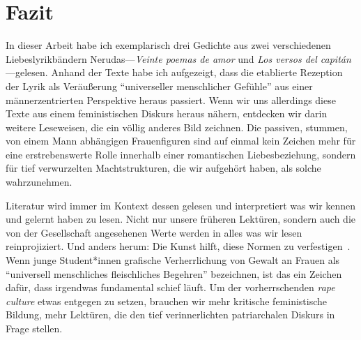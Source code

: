 \section{Fazit}

In dieser Arbeit habe ich exemplarisch drei Gedichte aus zwei verschiedenen Liebeslyrikbändern Nerudas—\textit{Veinte poemas de amor} und \textit{Los versos del capitán}—gelesen.
Anhand der Texte habe ich aufgezeigt, dass die etablierte Rezeption der Lyrik als Veräußerung ``universeller menschlicher Gefühle'' aus einer männerzentrierten Perspektive heraus passiert.
Wenn wir uns allerdings diese Texte aus einem feministischen Diskurs heraus nähern, entdecken wir darin weitere Leseweisen, die ein völlig anderes Bild zeichnen.
Die passiven, stummen, von einem Mann abhängigen Frauenfiguren sind auf einmal kein Zeichen mehr für eine erstrebenswerte Rolle innerhalb einer romantischen Liebesbeziehung, sondern für tief verwurzelten Machtstrukturen, die wir aufgehört haben, als solche wahrzunehmen.

Literatur wird immer im Kontext dessen gelesen und interpretiert was wir kennen und gelernt haben zu lesen.
Nicht nur unsere früheren Lektüren, sondern auch die von der Gesellschaft angesehenen Werte werden in alles was wir lesen reinprojiziert.
Und anders herum: Die Kunst hilft, diese Normen zu verfestigen~\cite{Kolodny1980}.
Wenn junge Student*innen grafische Verherrlichung von Gewalt an Frauen als ``universell menschliches fleischliches Begehren'' bezeichnen, ist das ein Zeichen dafür, dass irgendwas fundamental schief läuft.
Um der vorherrschenden \textit{rape culture} etwas entgegen zu setzen, brauchen wir mehr kritische feministische Bildung, mehr Lektüren, die den tief verinnerlichten patriarchalen Diskurs in Frage stellen.

\begin{comment}
* "als nah, natürlich wahrgenommen", die Leser*innen können sich damit identifizieren
  ** Duncan spricht von "real", "natural/beautiful expression of male/female relationships", die Menschen können sich damit identifizieren, sie sehen die Gedichte als Reflexion der gesellschaftlichen Idealen, die sie gelernt haben anzustreben
  ** Duncan:  "a sort of manual on the workings of modern romantic love and have come  to be regarded by many, as a standard agains which real life  relationships can be judged"
  ** Duncan: ".. in fact it seems extraordinarily "real" and "natural", as if it were not a literary construct at all, but, rather a reflection of real-life experiences. Readers who turn to these poems to learn "what love is supposed to be like", "what men are like", and "what women are like", ultimately receive a skewed message told from the traditional dominant male position"
\end{comment}

